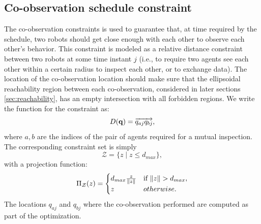 \documentclass[journal]{IEEEtran}  %
\def\sZ{\mathcal{Z}}
\begin{document}


\subsection{Co-observation schedule constraint}
The co-observation constraints is used to guarantee that, at time required by the schedule, two robots should get close enough with each other to observe each other's behavior. This constraint is modeled as a relative distance constraint between two robots at some time instant $j$ (i.e., to require two agents see each other within a certain radius to inspect each other, or to exchange data). The location of the co-observation location should make sure that the ellipsoidal reachability region between each co-observation, considered in later sections \ref{sec:reachability}, has an empty intersection with all forbidden regions.
 We write the function for the constraint as:
\begin{align}
D(\mathbf{q}) = \overrightarrow{q_{aj}q_{bj}},
\end{align}
where $a,b$ are the indices of the pair of agents required for a mutual inspection. The corresponding constraint set is simply
\begin{equation}
\sZ= \{z \mid z \leq d_{max} \},
\end{equation}
with a projection function:
\begin{equation}\label{eq:co-observation_constraint_update}
\Pi_{\sZ}(z) = \begin{cases}
d_{max}\frac{z}{\norm{z}} &\text{if } \norm{z} > d_{max},\\
z	& otherwise.
\end{cases}
\end{equation}
The locations $q_{aj}$ and $q_{bj}$ where the co-observation performed are computed as part of the optimization.
\end{document}
